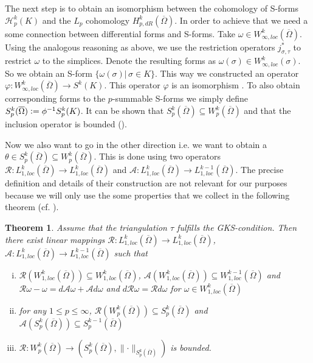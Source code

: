 \documentclass[12pt,a4paper]{article}
\newtheorem{theorem}{Theorem}
\theoremstyle{definition}
\newcommand{\aop}{\mathscr{A}}
\newcommand{\lpcoho}{H^k_{p,dR}}
\newcommand{\norm}[2]{\lVert #1 \rVert_{#2}}
\newcommand{\omegabar}{\overline{\Omega}}
\newcommand{\rop}{\mathscr{R}} %
\begin{document}
The next step is to obtain an isomorphism between the cohomology 
of S-forms $\mathscr{H}_p^k(K)$ and the $L_p$ cohomology 
$\lpcoho(\omegabar)$. 
In order to achieve that we need a some connection between differential forms
and S-forms. Take $\omega \in W_{\infty,loc}^k(\omegabar)$. Using the analogous
reasoning as above, we use the restriction operators $j^*_{\sigma,\tau}$ to 
restrict $\omega$ to the simplices. Denote the resulting 
forms as $\omega(\sigma) \in W^k_{\infty,loc}(\sigma)$. So we obtain an 
S-form $\{ \omega(\sigma) | \, \sigma \in K \}$. This way we constructed 
an operator $\varphi: W^k_{\infty,loc}(\omegabar) \rightarrow S^k(K)$. This 
operator $\varphi$ is an isomorphism \cite[Lemma\,1]{goldshtein}. 
To also obtain corresponding forms to the $p$-summable S-forms we simply 
define $S^k_p(\omegabar) \vcentcolon= \phi^{-1}S^k_p(K)$.
It can be shown that $S^k_p(\omegabar) \subseteq W^k_p(\omegabar)$ and that the inclusion 
operator is bounded (\cite[Lemma\,4]{goldshtein}). 


Now we also want to go in the other direction i.e. we want to obtain 
a $\theta \in S^k_p(\omegabar) \subseteq W^k_p(\omegabar)$. This is done 
using two operators $\rop: L^k_{1,loc}(\omegabar) \rightarrow 
L^k_{1,loc}(\omegabar)$ and $\aop: L^k_{1,loc}(\omegabar) \rightarrow 
L^{k-1}_{1,loc}(\omegabar)$.
The precise definition and details of their construction
are not relevant for our purposes because we will only use
the some properties that we collect in the following theorem
(cf. \cite[Thm.2]{goldshtein}).

\begin{theorem}\label{operators}
    Assume that the triangulation $\tau$ fulfills the GKS-condition.
    Then there exist linear mappings 
    $\mathscr{R}: L^k_{1,loc}(\omegabar) \rightarrow 
    L^k_{1,loc}(\omegabar)$, $\mathscr{A}: L^k_{1,loc}(\omegabar) 
    \rightarrow L^{k-1}_{1,loc}(\omegabar)$ 
    such that
    \begin{enumerate}[(i)]
        \item $\rop(W^k_{1,loc}(\omegabar)) \subseteq W^k_{1,loc}(\omegabar)$,
            $\aop(W^k_{1,loc}(\omegabar)) \subseteq W^{k-1}_{1,loc}(\omegabar)$
            and $\mathscr{R}\omega - \omega = 
            d\mathscr{A}\omega + \mathscr{A}d\omega$ and 
            $d\rop \omega  = \rop d \omega$ for 
            $\omega \in W^k_{1,loc}(\omegabar)$
        \item for any $1 \leq p \leq \infty$, 
            $\rop(W^k_p(\omegabar)) \subseteq S^k_p(\omegabar)$ and
            $\aop(S^k_p(\omegabar)) \subseteq S^{k-1}_p(\omegabar)$
        \item $\rop: W^k_p(\omegabar) \rightarrow 
            (S^k_p(\omegabar),\norm{\cdot}{S^k_p(\omegabar)})$ is bounded.
    \end{enumerate}
\end{theorem}
\end{document}
